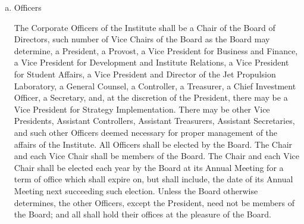 \begin{enumerate}[(a)]
\item Officers

The Corporate Officers of the Institute shall be a Chair of the Board of Directors, such number of Vice Chairs of the Board as the Board may determine, a President, a Provost, a Vice President for Business and Finance, a Vice President for Development and Institute Relations, a Vice President for Student Affairs, a Vice President and Director of the Jet Propulsion Laboratory, a General Counsel, a Controller, a Treasurer, a Chief Investment Officer, a Secretary, and, at the discretion of the President, there may be a Vice President for Strategy Implementation.  There may be other Vice Presidents, Assistant Controllers, Assistant Treasurers, Assistant Secretaries, and such other Officers deemed necessary for proper management of the affairs of the Institute.  All Officers shall be elected by the Board.  The Chair and each Vice Chair shall be members of the Board.  The Chair and each Vice Chair shall be elected each year by the Board at its Annual Meeting for a term of office which shall expire on, but shall include, the date of its Annual Meeting next succeeding such election.  Unless the Board otherwise determines, the other Officers, except the President, need not be members of the Board; and all shall hold their offices at the pleasure of the Board.
\end{enumerate}

